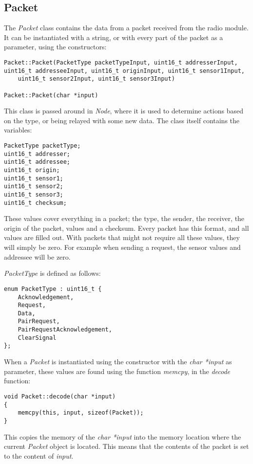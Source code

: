 \subsection{Packet}
The \textit{Packet} class contains the data from a packet received from the radio module. It can be instantiated with a string, or with every part of the packet as a parameter, using the constructors:
\begin{lstlisting}
Packet::Packet(PacketType packetTypeInput, uint16_t addresserInput, uint16_t addresseeInput, uint16_t originInput, uint16_t sensor1Input,
	uint16_t sensor2Input, uint16_t sensor3Input)
	
Packet::Packet(char *input)
\end{lstlisting}


This class is passed around in \textit{Node}, where it is used to determine actions based on the type, or being relayed with some new data. 
The class itself contains the variables:
\begin{lstlisting}
PacketType packetType;
uint16_t addresser;
uint16_t addressee;
uint16_t origin;
uint16_t sensor1;
uint16_t sensor2;
uint16_t sensor3;
uint16_t checksum;
\end{lstlisting}
These values cover everything in a packet; the type, the sender, the receiver, the origin of the packet, values and a checksum.
Every packet has this format, and all values are filled out. With packets that might not require all these values, they will simply be zero. For example when sending a request, the sensor values and addressee will be zero.

\textit{PacketType} is defined as follows:
\begin{lstlisting}
enum PacketType : uint16_t {
    Acknowledgement,
    Request,
    Data,
    PairRequest,
    PairRequestAcknowledgement,
    ClearSignal
};
\end{lstlisting}


When a \textit{Packet} is instantiated using the constructor with the \textit{char *input} as parameter, these values are found using the function \textit{memcpy}, in the \textit{decode} function:
\begin{lstlisting}
void Packet::decode(char *input)
{
    memcpy(this, input, sizeof(Packet));
}
\end{lstlisting}
This copies the memory of the \textit{char *input} into the memory location where the current \textit{Packet} object is located. This means that the contents of the packet is set to the content of \textit{input}.

